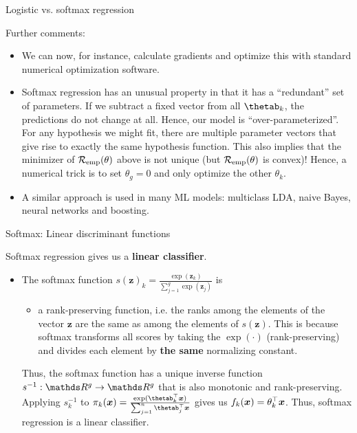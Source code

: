 \begin{vbframe}{Logistic vs. softmax regression}

Further comments:

\begin{itemize}

\item We can now, for instance, calculate gradients and optimize this with standard numerical optimization software.


\item Softmax regression has an unusual property in that it has a \enquote{redundant} set of parameters. If we subtract a fixed vector
  from all $\thetab_k$, the predictions do not change at all.
  Hence,  our model is \enquote{over-parameterized}. For any hypothesis we might fit,
  there are multiple parameter vectors that give rise to exactly the same hypothesis function.
  This also implies that the minimizer of $\mathcal{R}_{\text{emp}}(\theta)$ above is not unique (but $\mathcal{R}_{\text{emp}}(\theta)$ is convex)!
  Hence, a numerical trick is to set $\theta_g = 0$ and only optimize the other $\theta_k$.

\item A similar approach is used in many ML models: multiclass LDA, naive Bayes, neural networks and boosting.

\end{itemize}

\end{vbframe} 

\begin{vbframe}{Softmax: Linear discriminant functions}

Softmax regression gives us a \textbf{linear classifier}. 

\begin{itemize}
  \item The softmax function $s(\bm{z})_k = \frac{\exp(\bm{z}_k)}{\sum_{j = 1}^g \exp \left(\bm{z}_j\right)}$ is 

\begin{itemize}
  \item a rank-preserving function, i.e. the ranks among the elements of the vector $\bm{z}$ are the same as among the elements of $s(\bm{z})$. This is because softmax transforms all scores by taking the $\exp(\cdot)$ (rank-preserving) and divides each element by \textbf{the same} normalizing constant. 
\end{itemize}

Thus, the softmax function has a unique inverse function $s^{-1}: \R^g \to \R^g$ that is also monotonic and rank-preserving. Applying $s_k^{-1}$ to $\pi_k(\xv) = \frac{\exp(\thetab_k^\top \xv)}{\sum_{j = 1}^n \thetab_j^\top \xv}$ gives us $f_k(\bm{x}) = \theta_k^\top \bm{x}$. Thus, softmax regression is a linear classifier. 
\end{itemize}

\end{vbframe}

